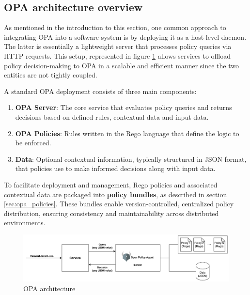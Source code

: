 \subsection{OPA architecture overview}

As mentioned in the introduction to this section, one common approach to integrating OPA into a software system is by deploying it as a host-level daemon. 
The latter is essentially a lightweight server that processes policy queries via HTTP requests. 
This setup, represented in figure \ref{fig:opa_architecture} allows services to offload policy decision-making to OPA in a scalable and efficient manner since the two entities are not tightly coupled.

A standard OPA deployment consists of three main components:

\begin{enumerate}[itemsep=0.2pt, topsep=1pt]
  \item \textbf{OPA Server}: The core service that evaluates policy queries and returns decisions based on defined rules, contextual data and input data.
  \item \textbf{OPA Policies}: Rules written in the Rego language that define the logic to be enforced.
  \item \textbf{Data}: Optional contextual information, typically structured in JSON format, that policies use to make informed decisions along with input data.
\end{enumerate}

To facilitate deployment and management, Rego policies and associated contextual data are packaged into \textbf{policy bundles}, as described in section \ref{sec:opa_policies}. These bundles enable version-controlled, centralized policy distribution, ensuring consistency and maintainability across distributed environments. \newline

\begin{figure}[t]
\centering
\includegraphics[width=1\linewidth]{images/OPA.png}
\caption{OPA architecture}
\label{fig:opa_architecture}
\end{figure}


